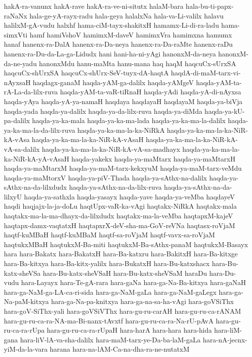 {hakA-ra-vanunx
hakA-rave
hakA-ra-ve-ni-situtx
halaM-bara
hala-bu-ti-papx-raNaNx
hala-ge-yA-rayx-radu
hala-geya
halalxNa
hala-va-Li-valilx
halavu
halilxM-gA-vudu
halxhf
hama-ciM-tayx-shakitxH
hamamx-Li-di-ra-ladu
hama-simxVti
hamf
hamiVshoV
hamimxM-daveV
hamimxVra
hamimxna
hamumx
hanaf
hanenx-ra-DalA
hanenx-ra-Da-neya
hanenx-ra-Da-raMte
hanenx-raDu
hanenx-ra-Du-da-La-ga-Lidudx
hani
hani-ha-ni-yAgi
hanonxM-da-neya
hanonxM-da-ne-yadu
hanonxMdu
hanu-maMta
hanu-mana
haq
haqM
haqcuCx-sUrxSA
haqcuCx-shUrxSA
haqcuCx-shUrx-SeV-tuyx-dA-haqtA
haqdA-di-maM-tarx-vi-nAyxsaH
haqdagx-ganaM
haqda-yAM-ga-dalilx
haqda-yAMgeV
haqda-yAM-ta-rA-La-da-lilx-ruva
haqda-yAM-ta-vaR-tiRnaH
haqda-yAdi
haqda-yA-di-nAyxsa
haqda-yAya
haqda-yA-ya-namaH
haqdaya
haqdayaH
haqdayaM
haqda-ya-biVja
haqda-yada
haqda-ya-dalilx
haqda-ya-da-lilx-ruva
haqda-ya-diMda
haqda-ya-kU-pa-dalilx
haqda-ya-ka-mala
haqda-ya-ka-ma-lada
haqda-ya-ka-ma-la-dalilx
haqda-ya-ka-ma-la-da-lilx-ruva
haqda-ya-ka-ma-la-ka-NiRkA
haqda-ya-ka-ma-la-ka-NiR-kA-vAsa
haqda-ya-ka-ma-la-ka-NiR-kA-vAsaH
haqda-ya-ka-ma-la-ka-NiR-kA-vA-sa-dalilx
haqda-ya-ka-ma-la-ka-NiR-kA-vA-sa-madhayx
haqda-ya-ka-ma-la-ka-NiR-kA-yA-vAsaH
haqda-yakekx
haqda-ya-maMtarx
haqda-ya-maMtarxH
haqda-ya-maMtarxM
haqda-ya-maM-tarx-kekxyuM
haqda-ya-maM-tarx-veMdu
haqda-ya-maMtorxV
haqda-ya-piV-Thada
haqda-ya-sAthx-na-dalilx
haqda-ya-sAthx-na-da-lilxdudx
haqda-ya-sAthx-na-da-lilx-ruva
haqda-ya-sAthx-na-da-lilxyU
haqda-ya-sathxla
haqda-yasayx
haqda-yave
haqda-ya-veMba
haqdayeV
haqdi
haqjajx-la-ja-doLu
haqtUpx-vaR-ka-vAgi
haqtakx-NiRkA
haqtakx-mala
haqtakx-ma-la-ma-dhayx-da-lilxdudx
haqtakx-ma-la-veMba
haqtapxM-kajeV
haqtapx-damx-vaqtatxH
haqtapxrX-deV-sha-ma-GoV-reVNa
haqtasx-roVjaM
haqtf-kuMBaH
haqtf-kuMBaM
haqtf-sa-roVjaM
haqtf-vavx-sa-roVjaM
haqtukxMBaH
haqtukxM-Ba-miti
haqtukxM-Ba-sAthx-panaM
haqtukxM-Basayx
hara
hara-Bakatx
hara-BakatxH
hara-Ba-katxru
hara-BakitxH
hara-Ba-kitxge
hara-Ba-kitxya
hara-Ba-kitx-yalilx
hara-BukatxH
hara-Bu-katxshacx
hara-Bu-katx-sheVSa
hara-Bu-katx-sheVSaH
hara-Bu-katx-sheVSaM
haraDu
hara-Du-vudu
hara-Layayx
hara-Te-gA-rara
hara-gaNa
hara-ga-Na-Ba-kitxya
hara-gaNaH
hara-ga-NaM-ga-LA-ca-ri-sida
hara-ga-NaM-gaLa
hara-ga-NaM-gaLegx
hara-ga-Na-paM-kitxya
hara-ga-Na-pa-knitxya
hara-ga-na-sa-ha-vAgi
hara-goVSiThx
hara-goV-SiThx-yali
hara-goVSiVThx
hara-gu-ru-carAH
hara-gu-ru-ca-rANAM
hara-gu-ru-ca-ra-NA-ma-Bi-nanx-tAvxtf
hara-gu-ru-ca-ra-Na-rU-pAvA
hara-gu-ru-ca-ra-rUpa
hara-gu-ru-ca-ra-rUpaH
hara-harA
hara-hara
hara-hida
hara-liM-gana
hara-liV-lA-va-sha-dalilx
hara-maM-tarx-ye-Da-ba-laM-gaLa
hara-nA-jecnx-yiM-da-la-vara
harana
hara-na-lAM-Ca-na-dha-ra-ne-nutatxM
}
